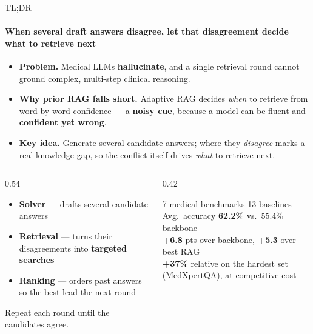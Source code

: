 \documentclass[10pt, aspectratio=169, t]{beamer}   %
\newcommand{\good}[1]{{\color{posblue}\bfseries #1}}  %
\newcommand{\warn}[1]{{\color{negmag}\bfseries #1}}   %
\newcommand{\blue}{\color{posblue}\bfseries}  %
\newcommand{\hl}{\color{posblue}\bfseries}    %
\begin{document}
\begin{frame}{TL;DR}
  \framesubtitle{When several draft answers disagree, let that disagreement decide what to retrieve next}
  \vfill
  \begin{itemize}\setlength{\itemsep}{5pt}
    \item \textbf{Problem.} Medical LLMs \warn{hallucinate}, and a single retrieval round cannot ground complex, multi-step clinical reasoning.
    \item \textbf{Why prior RAG falls short.} Adaptive RAG decides \emph{when} to retrieve from word-by-word confidence — a \warn{noisy cue}, because a model can be fluent and \warn{confident yet wrong}.
    \item \textbf{Key idea.} Generate several candidate answers; where they \emph{disagree} marks a real knowledge gap, so the conflict itself drives \emph{what} to retrieve next.
  \end{itemize}
  \vfill
  \begin{columns}[t]
    \begin{column}{0.54\textwidth}
      \begin{tcolorbox}[title={The 3-agent loop}]
        \begin{itemize}\setlength{\itemsep}{2pt}
          \item \textbf{Solver} — drafts several candidate answers
          \item \textbf{Retrieval} — turns their disagreements into \good{targeted searches}
          \item \textbf{Ranking} — orders past answers so the best lead the next round
        \end{itemize}
        {\footnotesize\color{muted}Repeat each round until the candidates agree.}
      \end{tcolorbox}
    \end{column}
    \hfill
    \begin{column}{0.42\textwidth}
      \begin{tcolorbox}[title={Results}]
        {\footnotesize\color{muted}7 medical benchmarks \textperiodcentered{} 13 baselines}\\[3pt]
        Avg.\ accuracy {\blue\textbf{62.2\%}} vs.\ 55.4\% backbone\\[3pt]
        {\blue\textbf{+6.8}} pts over backbone, {\blue\textbf{+5.3}} over best RAG\\[3pt]
        {\hl\textbf{+37\%}} relative on the hardest set (MedXpertQA), at competitive cost
      \end{tcolorbox}
    \end{column}
  \end{columns}
  \vfill
\end{frame}
\end{document}
